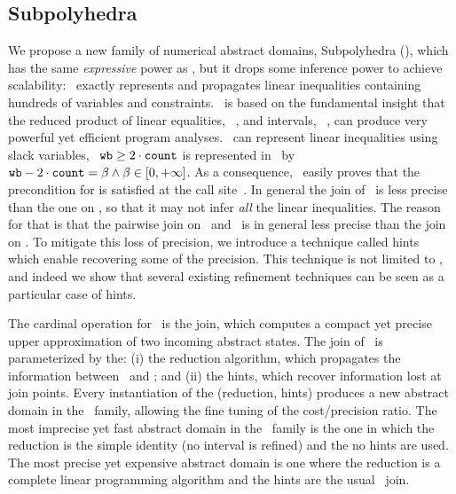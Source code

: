 \documentclass[sttt]{svjour}
\begin{document}
\subsection{Subpolyhedra}
We propose a new family of  numerical abstract domains, Subpolyhedra (\Subpoly), which has the same \emph{expressive} power as \Polyhedra, but it drops some  inference power to achieve scalability:
\Subpoly\  exactly represents and  propagates linear inequalities containing hundreds of variables and constraints. 
\Subpoly\ is based on the fundamental insight that the reduced product of linear equalities, \LinEq~\cite{Karr76}, and intervals, \Intervals~\cite{CousotCousot77}, can produce very powerful yet efficient program analyses.
\Subpoly\ can represent linear inequalities using slack variables, \eg\  $\mathtt{wb} \geq 2 \cdot \mathtt{count}$ is represented in \Subpoly\ by $\mathtt{wb} - 2 \cdot \mathtt{count} = \beta \wedge \beta \in [0, +\infty]$.
As a consequence, \Subpoly\  easily proves that  the precondition for  is satisfied at the call site~\code{(*)}.
In general the join of  \Subpoly\ is less precise than the one on \Polyhedra{}, so that it may not infer \emph{all} the linear inequalities.
The reason for that is that the pairwise join  on \LinEq\ and \Intervals\ is in general less precise than the join on \Poly.
To mitigate this loss of precision, we introduce a technique called hints~\cite{Lavironlogozzo09-2} which enable recovering some of the precision.
This technique is not limited to \Subpoly, and indeed we show that several existing refinement techniques can be seen as a particular case of hints.

The cardinal operation for \Subpoly\  is the join, which computes a compact yet precise upper approximation of two incoming abstract states.
The join of \Subpoly\ is parameterized by the: (i) the reduction algorithm, which propagates the information between \LinEq\ and \Intervals;   and (ii) the hints, which recover information lost at join points.
Every instantiation of the (reduction, hints) produces a new abstract domain in the \Subpoly\ family, allowing the fine tuning of the cost/precision ratio.
The most imprecise yet fast abstract domain in the \Subpoly\ family is the one in which the reduction is the simple identity (no interval is refined) and the no hints are used.
The most precise yet expensive abstract domain is one where the reduction is a complete linear programming algorithm and the hints are the usual \Polyhedra\ join. 
\end{document}
